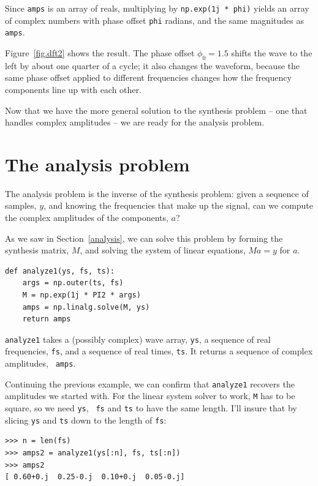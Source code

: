 \documentclass[12pt]{book}
\begin{document}
Since {\tt amps}
is an array of reals, multiplying by {\tt np.exp(1j * phi)} yields
an array of complex numbers with phase offset {\tt phi} radians, and
the same magnitudes as {\tt amps}.

Figure~\ref{fig.dft2} shows the result.  The phase offset
$\phi_0 = 1.5$ shifts the wave to the left by about one quarter of
a cycle; it also changes the waveform, because the same phase
offset applied to different frequencies changes how the frequency
components line up with each other.

Now that we have the more general solution to the synthesis problem --
one that handles complex amplitudes -- we are ready for the analysis
problem.


\section{The analysis problem}

The analysis problem is the inverse of the synthesis problem: given a
sequence of samples, $y$, and knowing the frequencies
that make up the signal, can we compute the complex amplitudes of the
components, $a$?

As we saw in Section~\ref{analysis}, we can solve this problem by forming
the synthesis matrix, $M$, and solving the system of linear
equations, $M a = y$ for $a$.

\begin{verbatim}
def analyze1(ys, fs, ts):
    args = np.outer(ts, fs)
    M = np.exp(1j * PI2 * args)
    amps = np.linalg.solve(M, ys)
    return amps
\end{verbatim}

{\tt analyze1} takes a (possibly complex) wave array, {\tt ys}, a
sequence of real frequencies, {\tt fs}, and a sequence of real
times, {\tt ts}.  It returns a sequence of complex amplitudes, {\tt
  amps}.

Continuing the previous example, we can confirm that {\tt analyze1}
recovers the amplitudes we started with.  For the linear system
solver to work, {\tt M} has to be square, so we need {\tt ys}, {\tt
  fs} and {\tt ts} to have the same length.  I'll insure that by
slicing {\tt ys} and {\tt ts} down to the length of {\tt fs}:

\begin{verbatim}
>>> n = len(fs)
>>> amps2 = analyze1(ys[:n], fs, ts[:n])
>>> amps2
[ 0.60+0.j  0.25-0.j  0.10+0.j  0.05-0.j]
\end{verbatim}
\end{document}
